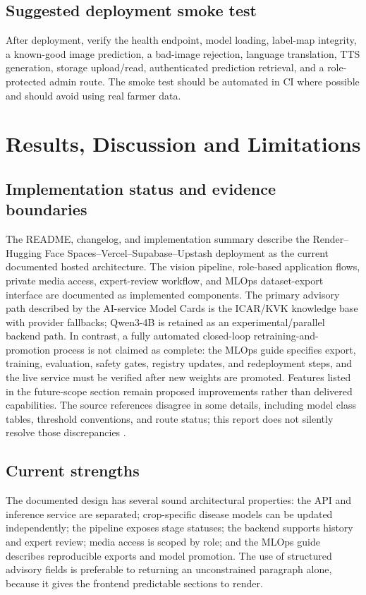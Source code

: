 \documentclass[12pt,a4paper,oneside,openany]{report}
\begin{document}
\section{Suggested deployment smoke test}
After deployment, verify the health endpoint, model loading, label-map integrity, a known-good image prediction, a bad-image rejection, language translation, TTS generation, storage upload/read, authenticated prediction retrieval, and a role-protected admin route. The smoke test should be automated in CI where possible and should avoid using real farmer data.

\chapter{Results, Discussion and Limitations}
\section{Implementation status and evidence boundaries}
The README, changelog, and implementation summary describe the Render--Hugging Face Spaces--Vercel--Supabase--Upstash deployment as the current documented hosted architecture. The vision pipeline, role-based application flows, private media access, expert-review workflow, and MLOps dataset-export interface are documented as implemented components. The primary advisory path described by the AI-service Model Cards is the ICAR/KVK knowledge base with provider fallbacks; Qwen3-4B is retained as an experimental/parallel backend path. In contrast, a fully automated closed-loop retraining-and-promotion process is not claimed as complete: the MLOps guide specifies export, training, evaluation, safety gates, registry updates, and redeployment steps, and the live service must be verified after new weights are promoted. Features listed in the future-scope section remain proposed improvements rather than delivered capabilities. The source references disagree in some details, including model class tables, threshold conventions, and route status; this report does not silently resolve those discrepancies \cite{project_readme,changelog,model_cards,mlops_guide}.

\section{Current strengths}
The documented design has several sound architectural properties: the API and inference service are separated; crop-specific disease models can be updated independently; the pipeline exposes stage statuses; the backend supports history and expert review; media access is scoped by role; and the MLOps guide describes reproducible exports and model promotion. The use of structured advisory fields is preferable to returning an unconstrained paragraph alone, because it gives the frontend predictable sections to render.
\end{document}
